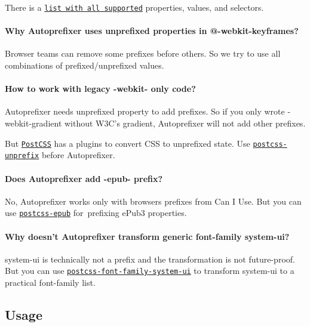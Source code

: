 There is a \href{https://github.com/postcss/autoprefixer/wiki/support-list}{\tt list with all supported} properties, values, and selectors.

\paragraph*{Why Autoprefixer uses unprefixed properties in {\ttfamily @-\/webkit-\/keyframes}?}

Browser teams can remove some prefixes before others. So we try to use all combinations of prefixed/unprefixed values.

\paragraph*{How to work with legacy {\ttfamily -\/webkit-\/} only code?}

Autoprefixer needs unprefixed property to add prefixes. So if you only wrote {\ttfamily -\/webkit-\/gradient} without W3\+C’s {\ttfamily gradient}, Autoprefixer will not add other prefixes.

But \href{https://github.com/postcss/postcss}{\tt Post\+C\+SS} has a plugins to convert C\+SS to unprefixed state. Use \href{https://github.com/gucong3000/postcss-unprefix}{\tt postcss-\/unprefix} before Autoprefixer.

\paragraph*{Does Autoprefixer add {\ttfamily -\/epub-\/} prefix?}

No, Autoprefixer works only with browsers prefixes from Can I Use. But you can use \href{https://github.com/Rycochet/postcss-epub}{\tt postcss-\/epub} for prefixing e\+Pub3 properties.

\paragraph*{Why doesn’t Autoprefixer transform generic font-\/family {\ttfamily system-\/ui}?}

{\ttfamily system-\/ui} is technically not a prefix and the transformation is not future-\/proof. But you can use \href{https://github.com/JLHwung/postcss-font-family-system-ui}{\tt postcss-\/font-\/family-\/system-\/ui} to transform {\ttfamily system-\/ui} to a practical font-\/family list.

\subsection*{Usage}

